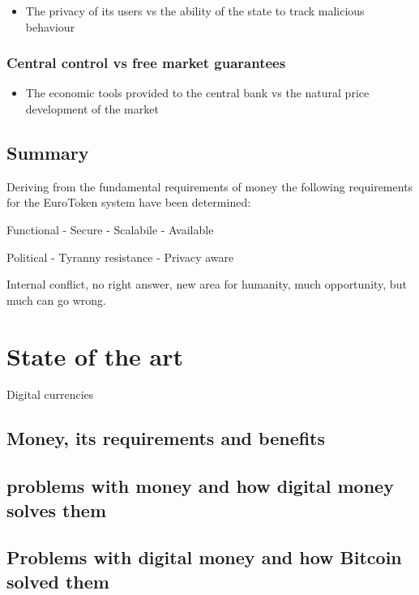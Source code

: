 \documentclass[whitelogo]{tudelft-report}
\providecommand{\tightlist}{%
  \setlength{\itemsep}{0pt}\setlength{\parskip}{0pt}}
\begin{document}
\begin{itemize}
\tightlist
\item
  The privacy of its users vs the ability of the state to track
  malicious behaviour
\end{itemize}

\subsection{Central control vs free market
guarantees}\label{central-control-vs-free-market-guarantees}

\begin{itemize}
\tightlist
\item
  The economic tools provided to the central bank vs the natural price
  development of the market
\end{itemize}

\section{Summary}\label{summary}

Deriving from the fundamental requirements of money the following
requirements for the EuroToken system have been determined:

Functional - Secure - Scalabile - Available

Political - Tyranny resistance - Privacy aware

Internal conflict, no right answer, new area for humanity, much
opportunity, but much can go wrong.

\chapter{State of the art}\label{state-of-the-art}

Digital currencies

\section{Money, its requirements and
benefits}\label{money-its-requirements-and-benefits}

\section{problems with money and how digital money solves
them}\label{problems-with-money-and-how-digital-money-solves-them}

\section{Problems with digital money and how Bitcoin solved
them}\label{problems-with-digital-money-and-how-bitcoin-solved-them}
\end{document}

